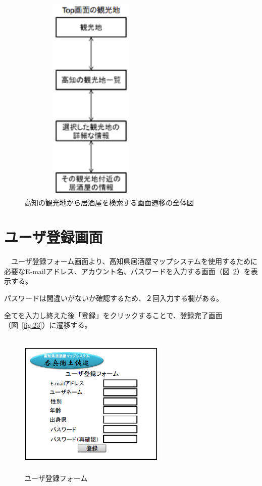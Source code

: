 \documentclass[a4j,titlepage]{jarticle}
\begin{document}
\begin {figure}[!htbp]
    \begin{center}
    \includegraphics [height=10cm, width=7cm]{21.eps}
    \caption {高知の観光地から居酒屋を検索する画面遷移の全体図}
    \label {fig:21}
    \end{center}
\end {figure}

\clearpage

\section{ユーザ登録画面}
　ユーザ登録フォーム画面より、高知県居酒屋マップシステムを使用するために必要なE-mailアドレス、アカウント名、パスワードを入力する画面（図~\ref{fig:22}）を表示する。



パスワードは間違いがないか確認するため、２回入力する欄がある。



全てを入力し終えた後「登録」をクリックすることで、登録完了画面（図~\ref{fig:23}）に遷移する。




\begin {figure}[!htbp]
    \begin{center}
    \includegraphics [height=7cm, width=7cm]{22.eps}
    \caption {ユーザ登録フォーム}
    \label {fig:22}
    \end{center}
\end {figure}
\end{document}
